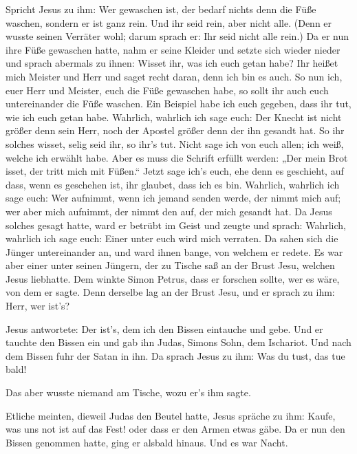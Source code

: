  Spricht Jesus zu ihm: Wer gewaschen ist, der bedarf
nichts denn die Füße waschen, sondern er ist ganz rein. Und ihr seid
rein, aber nicht alle.  (Denn er wusste seinen Verräter
wohl; darum sprach er: Ihr seid nicht alle rein.)  Da er
nun ihre Füße gewaschen hatte, nahm er seine Kleider und setzte sich
wieder nieder und sprach abermals zu ihnen: Wisset ihr, was ich euch
getan habe?  Ihr heißet mich Meister und Herr und saget
recht daran, denn ich bin es auch.  So nun ich, euer Herr
und Meister, euch die Füße gewaschen habe, so sollt ihr auch euch
untereinander die Füße waschen.  Ein Beispiel habe ich
euch gegeben, dass ihr tut, wie ich euch getan habe. 
Wahrlich, wahrlich ich sage euch: Der Knecht ist nicht größer denn sein
Herr, noch der Apostel größer denn der ihn gesandt hat. 
So ihr solches wisset, selig seid ihr, so ihr's tut. 
Nicht sage ich von euch allen; ich weiß, welche ich erwählt habe. Aber
es muss die Schrift erfüllt werden: „Der mein Brot isset, der tritt mich
mit Füßen.``  Jetzt sage ich's euch, ehe denn es
geschieht, auf dass, wenn es geschehen ist, ihr glaubet, dass ich es
bin.  Wahrlich, wahrlich ich sage euch: Wer aufnimmt,
wenn ich jemand senden werde, der nimmt mich auf; wer aber mich
aufnimmt, der nimmt den auf, der mich gesandt hat.  Da
Jesus solches gesagt hatte, ward er betrübt im Geist und zeugte und
sprach: Wahrlich, wahrlich ich sage euch: Einer unter euch wird mich
verraten.  Da sahen sich die Jünger untereinander an, und
ward ihnen bange, von welchem er redete.  Es war aber
einer unter seinen Jüngern, der zu Tische saß an der Brust Jesu, welchen
Jesus liebhatte.  Dem winkte Simon Petrus, dass er
forschen sollte, wer es wäre, von dem er sagte.  Denn
derselbe lag an der Brust Jesu, und er sprach zu ihm: Herr, wer ist's?

 Jesus antwortete: Der ist's, dem ich den Bissen
eintauche und gebe. Und er tauchte den Bissen ein und gab ihn Judas,
Simons Sohn, dem Ischariot.  Und nach dem Bissen fuhr der
Satan in ihn. Da sprach Jesus zu ihm: Was du tust, das tue bald!

 Das aber wusste niemand am Tische, wozu er's ihm sagte.

 Etliche meinten, dieweil Judas den Beutel hatte, Jesus
spräche zu ihm: Kaufe, was uns not ist auf das Fest! oder dass er den
Armen etwas gäbe.  Da er nun den Bissen genommen hatte,
ging er alsbald hinaus. Und es war Nacht.

